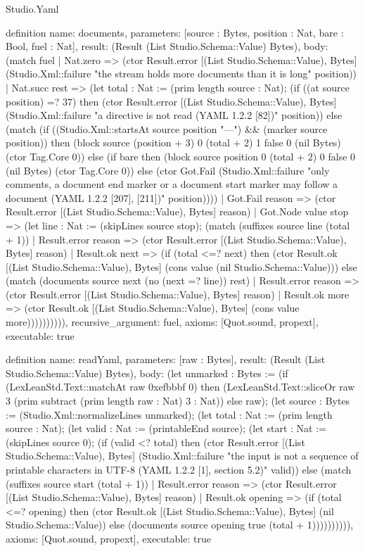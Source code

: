 \begin{lexlean}{Studio.Yaml}
\begin{semanticmodule}
definition{
  name: documents,
  parameters: [source : Bytes, position : Nat, bare : Bool, fuel : Nat],
  result: (Result (List Studio.Schema::Value) Bytes),
  body: (match fuel
    | Nat.zero => (ctor Result.error [(List Studio.Schema::Value), Bytes] (Studio.Xml::failure "the stream holds more documents than it is long" position))
    | Nat.succ rest => (let total : Nat := (prim length source : Nat); (if ((at source position) =? 37) then (ctor Result.error [(List Studio.Schema::Value), Bytes] (Studio.Xml::failure "a directive is not read (YAML 1.2.2 [82])" position)) else (match (if ((Studio.Xml::startsAt source position "---") && (marker source position)) then (block source (position + 3) 0 (total + 2) 1 false 0 (nil Bytes) (ctor Tag.Core 0)) else (if bare then (block source position 0 (total + 2) 0 false 0 (nil Bytes) (ctor Tag.Core 0)) else (ctor Got.Fail (Studio.Xml::failure "only comments, a document end marker or a document start marker may follow a document (YAML 1.2.2 [207], [211])" position))))
      | Got.Fail reason => (ctor Result.error [(List Studio.Schema::Value), Bytes] reason)
      | Got.Node value stop => (let line : Nat := (skipLines source stop); (match (suffixes source line (total + 1))
        | Result.error reason => (ctor Result.error [(List Studio.Schema::Value), Bytes] reason)
        | Result.ok next => (if (total <=? next) then (ctor Result.ok [(List Studio.Schema::Value), Bytes] (cons value (nil Studio.Schema::Value))) else (match (documents source next (no (next =? line)) rest)
          | Result.error reason => (ctor Result.error [(List Studio.Schema::Value), Bytes] reason)
          | Result.ok more => (ctor Result.ok [(List Studio.Schema::Value), Bytes] (cons value more)))))))))),
  recursive_argument: fuel,
  axioms: [Quot.sound, propext],
  executable: true
}

definition{
  name: readYaml,
  parameters: [raw : Bytes],
  result: (Result (List Studio.Schema::Value) Bytes),
  body: (let unmarked : Bytes := (if (LexLeanStd.Text::matchAt raw 0xefbbbf 0) then (LexLeanStd.Text::sliceOr raw 3 (prim subtract (prim length raw : Nat) 3 : Nat)) else raw); (let source : Bytes := (Studio.Xml::normalizeLines unmarked); (let total : Nat := (prim length source : Nat); (let valid : Nat := (printableEnd source); (let start : Nat := (skipLines source 0); (if (valid <? total) then (ctor Result.error [(List Studio.Schema::Value), Bytes] (Studio.Xml::failure "the input is not a sequence of printable characters in UTF-8 (YAML 1.2.2 [1], section 5.2)" valid)) else (match (suffixes source start (total + 1))
    | Result.error reason => (ctor Result.error [(List Studio.Schema::Value), Bytes] reason)
    | Result.ok opening => (if (total <=? opening) then (ctor Result.ok [(List Studio.Schema::Value), Bytes] (nil Studio.Schema::Value)) else (documents source opening true (total + 1)))))))))),
  axioms: [Quot.sound, propext],
  executable: true
}


\end{semanticmodule}
\end{lexlean}
